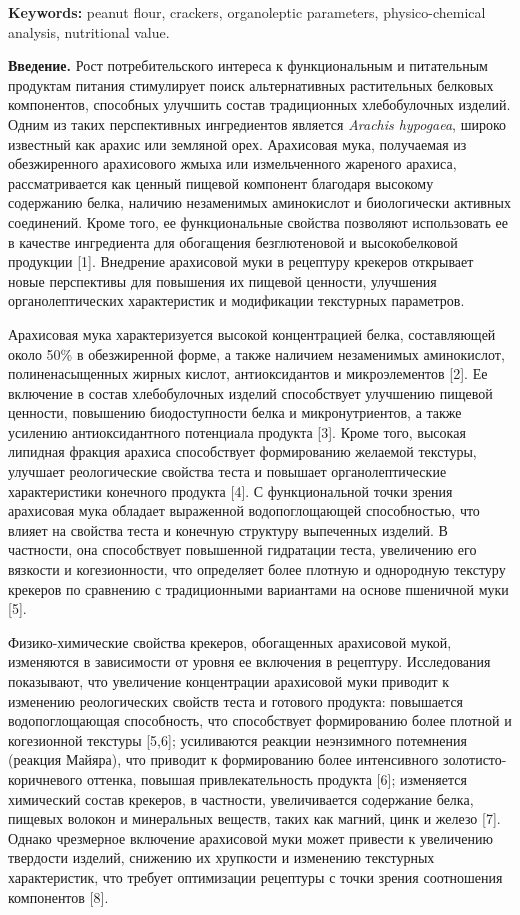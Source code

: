{\bfseries Keywords:} peanut flour, crackers, organoleptic parameters,
physico-chemical analysis, nutritional value.

\begin{multicols}{2}
{\bfseries Введение.} Рост потребительского интереса к функциональным и
питательным продуктам питания стимулирует поиск альтернативных
растительных белковых компонентов, способных улучшить состав
традиционных хлебобулочных изделий. Одним из таких перспективных
ингредиентов является \emph{Arachis hypogaea}, широко известный как
арахис или земляной орех. Арахисовая мука, получаемая из обезжиренного
арахисового жмыха или измельченного жареного арахиса, рассматривается
как ценный пищевой компонент благодаря высокому содержанию белка,
наличию незаменимых аминокислот и биологически активных соединений.
Кроме того, ее функциональные свойства позволяют использовать ее в
качестве ингредиента для обогащения безглютеновой и высокобелковой
продукции {[}1{]}. Внедрение арахисовой муки в рецептуру крекеров
открывает новые перспективы для повышения их пищевой ценности, улучшения
органолептических характеристик и модификации текстурных параметров.

Арахисовая мука характеризуется высокой концентрацией белка,
составляющей около 50\% в обезжиренной форме, а также наличием
незаменимых аминокислот, полиненасыщенных жирных кислот, антиоксидантов
и микроэлементов {[}2{]}. Ее включение в состав хлебобулочных изделий
способствует улучшению пищевой ценности, повышению биодоступности белка
и микронутриентов, а также усилению антиоксидантного потенциала продукта
{[}3{]}. Кроме того, высокая липидная фракция арахиса способствует
формированию желаемой текстуры, улучшает реологические свойства теста и
повышает органолептические характеристики конечного продукта {[}4{]}. С
функциональной точки зрения арахисовая мука обладает выраженной
водопоглощающей способностью, что влияет на свойства теста и конечную
структуру выпеченных изделий. В частности, она способствует повышенной
гидратации теста, увеличению его вязкости и когезионности, что
определяет более плотную и однородную текстуру крекеров по сравнению с
традиционными вариантами на основе пшеничной муки {[}5{]}.

Физико-химические свойства крекеров, обогащенных арахисовой мукой,
изменяются в зависимости от уровня ее включения в рецептуру.
Исследования показывают, что увеличение концентрации арахисовой муки
приводит к изменению реологических свойств теста и готового продукта:
повышается водопоглощающая способность, что способствует формированию
более плотной и когезионной текстуры {[}5,6{]}; усиливаются реакции
неэнзимного потемнения (реакция Майяра), что приводит к формированию
более интенсивного золотисто-коричневого оттенка, повышая
привлекательность продукта {[}6{]}; изменяется химический состав
крекеров, в частности, увеличивается содержание белка, пищевых волокон и
минеральных веществ, таких как магний, цинк и железо {[}7{]}. Однако
чрезмерное включение арахисовой муки может привести к увеличению
твердости изделий, снижению их хрупкости и изменению текстурных
характеристик, что требует оптимизации рецептуры с точки зрения
соотношения компонентов {[}8{]}.


\end{multicols}
